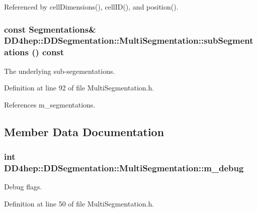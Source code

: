 Referenced by cellDimensions(), cellID(), and position().\hypertarget{class_d_d4hep_1_1_d_d_segmentation_1_1_multi_segmentation_a8a5a0095cb0f92224d1e221449cdcad8}{
\subsubsection[{subSegmentations}]{\setlength{\rightskip}{0pt plus 5cm}const {\bf Segmentations}\& DD4hep::DDSegmentation::MultiSegmentation::subSegmentations () const}}
\label{class_d_d4hep_1_1_d_d_segmentation_1_1_multi_segmentation_a8a5a0095cb0f92224d1e221449cdcad8}


The underlying sub-\/segementations. 

Definition at line 92 of file MultiSegmentation.h.

References m\_\-segmentations.

\subsection{Member Data Documentation}
\hypertarget{class_d_d4hep_1_1_d_d_segmentation_1_1_multi_segmentation_aa78b5218bf4246b81cf5e74a1233184c}{
\subsubsection[{m\_\-debug}]{\setlength{\rightskip}{0pt plus 5cm}int {\bf DD4hep::DDSegmentation::MultiSegmentation::m\_\-debug}}}
\label{class_d_d4hep_1_1_d_d_segmentation_1_1_multi_segmentation_aa78b5218bf4246b81cf5e74a1233184c}


Debug flags. 

Definition at line 50 of file MultiSegmentation.h.

